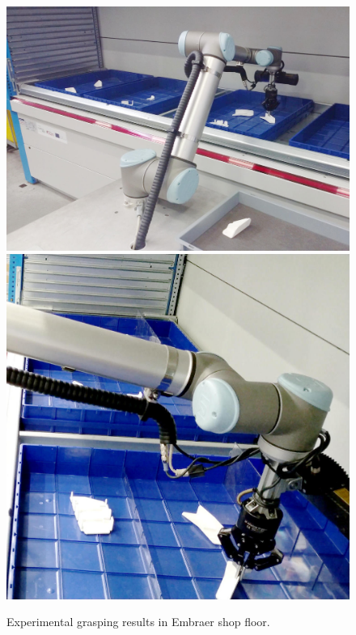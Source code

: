 \begin{figure}[h!]
{\begin{tcolorbox}
	\includegraphics[height=.15\textheight]{Cap5/Figuras/picking_embraer/back-6}
	\includegraphics[height=.15\textheight]{Cap5/Figuras/picking_embraer/side-6}
	\end{tcolorbox}
	\caption{Experimental grasping results in Embraer shop floor.}
	\label{fig:embraer_result}
}
\end{figure}




